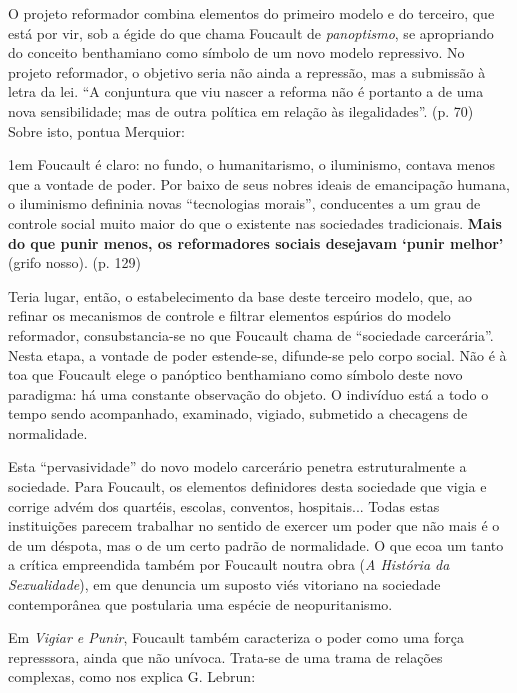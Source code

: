 \documentclass[12pt,a4paper]{article}
\newenvironment{citac}
{
	\begin{addmargin}
		[4cm]{1em} \footnotesize}{\normalfont 
	\end{addmargin}
}
\begin{document}
	O projeto reformador combina elementos do primeiro modelo e do 
	terceiro, que está por vir, sob a égide do que chama Foucault de 
	\textit{panoptismo}, se apropriando do conceito benthamiano como 
	símbolo de um novo modelo repressivo. No projeto reformador, o 
	objetivo seria não ainda a repressão, mas a submissão à letra da 
	lei. ``A conjuntura que viu nascer a reforma não é portanto a de 
	uma nova sensibilidade; mas de outra política em relação às 
	ilegalidades''. \cite{foucault} (p. 70)
    Sobre isto, pontua Merquior: 

	\begin{citac}
		Foucault é claro: no fundo, o humanitarismo, o iluminismo, 
		contava menos que a vontade de poder. Por baixo de seus nobres 
		ideais de emancipação humana, o iluminismo defininia novas 
		``tecnologias morais'', conducentes a um grau de controle social 
		muito maior do que o existente nas sociedades tradicionais.
		\textbf{Mais do que punir menos, os reformadores 
		sociais desejavam `punir melhor'} (grifo nosso). 
		\cite{merquior} (p. 129)
	\end{citac}
	
	Teria lugar, então, o estabelecimento da base deste terceiro modelo, 
	que, ao refinar os mecanismos de controle e filtrar elementos 
	espúrios do modelo reformador, consubstancia-se no que Foucault 
	chama de ``sociedade carcerária''. Nesta etapa, a vontade de 
	poder estende-se, difunde-se pelo corpo social. Não é à toa que 
	Foucault elege o panóptico benthamiano como símbolo deste novo 
	paradigma: há uma constante observação do objeto. O indivíduo 
	está a todo o tempo sendo acompanhado, examinado, vigiado, 
	submetido a checagens de normalidade. 

	Esta ``pervasividade'' do novo modelo carcerário penetra 
	estruturalmente a sociedade. Para Foucault, os elementos 
	definidores desta sociedade que vigia e corrige advém dos 
	quartéis, escolas, conventos, hospitais... Todas estas 
	instituições parecem trabalhar no sentido de exercer um poder 
	que não mais é o de um déspota, mas o de um certo padrão de 
	normalidade. O que ecoa um tanto a crítica empreendida também 
	por Foucault noutra obra (\textit{A História da Sexualidade}), em que 
	denuncia um suposto viés vitoriano na sociedade contemporânea 
	que postularia uma espécie de neopuritanismo. 

	Em \textit{Vigiar e Punir}, Foucault também caracteriza o poder como 
	uma força represssora, ainda que não unívoca. Trata-se de uma 
	trama de relações complexas, como nos explica G. Lebrun: 
\end{document}
